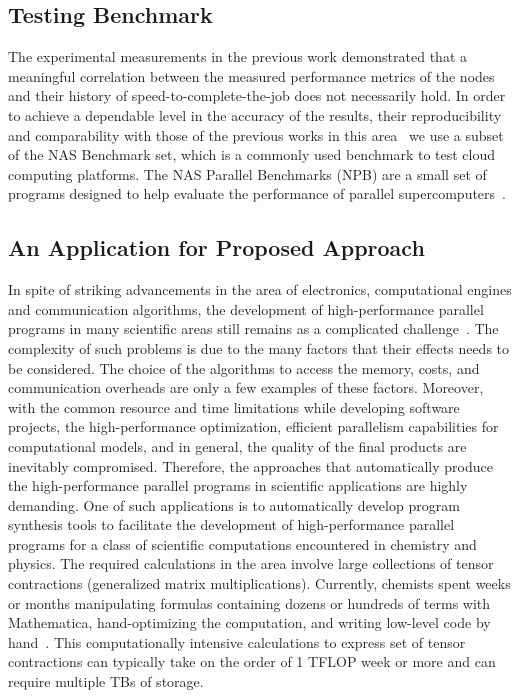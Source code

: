 \documentclass{sig-alternate}
\begin{document}
\subsection{Testing Benchmark}
The experimental measurements in the previous work\cite{peterson:decentralized} demonstrated that a meaningful correlation between the measured performance metrics of the nodes and their history of speed-to-complete-the-job does not necessarily hold. In order to achieve a dependable level in the accuracy of the results, their reproducibility and comparability with those of the previous works in this area~\cite{peterson:decentralized, Evangelinos08cloudcomputing} we use a subset of the NAS Benchmark set, which is a commonly used benchmark to test cloud computing platforms. The NAS Parallel Benchmarks (NPB) are a small set of programs designed to help evaluate the performance of parallel supercomputers~\cite{nasbenchmark:2016}.

\subsection{An Application for Proposed Approach}

In spite of striking advancements in the area of electronics, computational engines and communication algorithms, the development of high-performance parallel programs in many scientific areas still remains as a complicated challenge~\cite{baumgartner:compiler}. The complexity of such problems is due to the many factors that their effects needs to be considered. The choice of the algorithms to access the memory, costs, and communication overheads are only a few examples of these factors.
Moreover, with the common resource and time limitations while developing software projects,  the high-performance optimization, efficient parallelism capabilities for computational models, and in general, the quality of the final products are inevitably compromised. Therefore, the approaches that automatically produce the high-performance parallel programs in scientific applications are highly demanding.
One of such applications is to automatically develop program synthesis tools to facilitate the development of high-performance parallel programs for a class of scientific computations encountered in chemistry
and physics. The required calculations in the area involve large collections of tensor contractions (generalized matrix multiplications). Currently, chemists spent weeks or months manipulating formulas containing dozens or hundreds of terms with Mathematica, hand-optimizing the computation, and writing low-level code by hand~\cite{tce:tensor:2015}. This computationally intensive calculations to express set of tensor contractions can typically take on the order of 1 TFLOP week or more and can require multiple TBs of storage.
\end{document}
